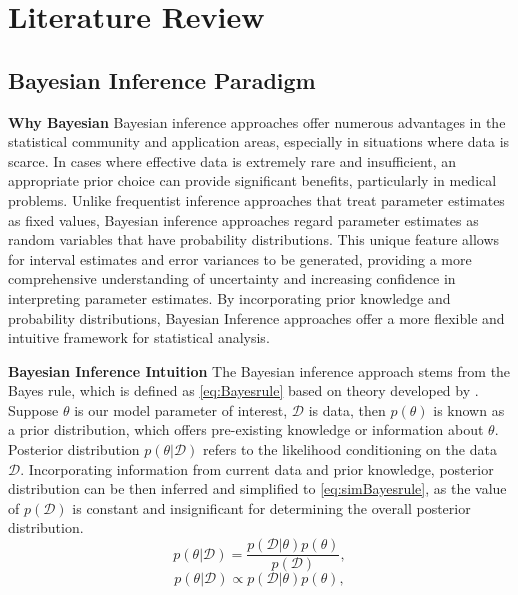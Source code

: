 \chapter{Literature Review}
\label{Chapter2}

\section{Bayesian Inference Paradigm}
\label{bayeisanP}
\textbf{Why Bayesian}
Bayesian inference approaches offer numerous advantages in the statistical community and application areas, especially in situations where data is scarce. In cases where effective data is extremely rare and insufficient, an appropriate prior choice can provide significant benefits, particularly in medical problems. Unlike frequentist inference approaches that treat parameter estimates as fixed values, Bayesian inference approaches regard parameter estimates as random variables that have probability distributions. This unique feature allows for interval estimates and error variances to be generated, providing a more comprehensive understanding of uncertainty and increasing confidence in interpreting parameter estimates. By incorporating prior knowledge and probability distributions, Bayesian Inference approaches offer a more flexible and intuitive framework for statistical analysis.

\textbf{Bayesian Inference Intuition}
The Bayesian inference approach stems from the Bayes rule, which is defined as \autoref{eq:Bayesrule} based on theory developed by \cite{Beech1959}. Suppose $\theta$ is our model parameter of interest, $\mathcal{D}$ is data, then $p(\theta)$ is known as a prior distribution, which offers pre-existing knowledge or information about $\theta$. Posterior distribution $p(\theta|\mathcal{D})$ refers to the likelihood conditioning on the data $\mathcal{D}$.
Incorporating information from current data and prior knowledge, posterior distribution can be then inferred and simplified to \autoref{eq:simBayesrule}, as the value of $p(\mathcal{D})$ is constant and insignificant for determining the overall posterior distribution. 
\begin{equation}
	p(\theta|\mathcal{D}) = \frac{p(\mathcal{D}|\theta)p(\theta)}{p(\mathcal{D})},
	\label{eq:Bayesrule}
\end{equation}
\begin{equation}
	p(\theta|\mathcal{D}) \propto p(\mathcal{D}|\theta)p(\theta),
	\label{eq:simBayesrule}
\end{equation}
